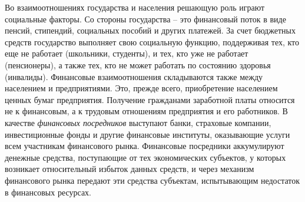 \documentclass[a4paper,12pt,fleqn]{article} %
\begin{document}
Во взаимоотношениях государства и населения решающую роль играют социальные факторы. Со стороны государства – это финансовый поток в виде пенсий, стипендий, социальных пособий и других платежей. За счет бюджетных средств государство выполняет свою социальную функцию, поддерживая тех, кто еще не работает (школьники, студенты), и тех, кто уже не работает (пенсионеры), а также тех, кто не может работать по состоянию здоровья (инвалиды). Финансовые взаимоотношения складываются также между населением и предприятиями. Это, прежде всего, приобретение населением ценных бумаг предприятия. Получение гражданами заработной платы относится не к финансовым, а к трудовым отношениям предприятия и его работников. В качестве \textit{финансовых посредников} выступают банки, страховые компании, инвестиционные фонды и другие финансовые институты, оказывающие услуги всем участникам финансового рынка. Финансовые посредники аккумулируют денежные средства, поступающие от тех экономических субъектов, у которых возникает относительный избыток данных средств, и через механизм финансового рынка передают эти средства субъектам, испытывающим недостаток в финансовых ресурсах.
\end{document}
